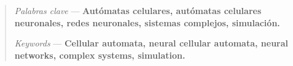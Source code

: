 \begin{abstract}
	\vspace{0.8em}
	\noindent \textit{Palabras clave} --- \textbf{Autómatas celulares, autómatas celulares neuronales, redes neuronales, sistemas complejos, simulación.}

	\vspace{0.4em}
	\begin{otherlanguage}{english}
	\noindent \textit{Keywords} --- \textbf{Cellular automata, neural cellular automata, neural networks, complex systems, simulation.}
	\end{otherlanguage}

\end{abstract}
